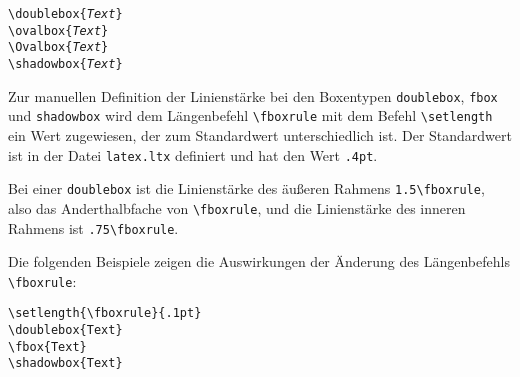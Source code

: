 \begin{center}
\hspace{5mm}
\hspace{5mm}
\hspace{5mm}
\end{center}

\begin{boxedminipage}{\textwidth}
\texttt{\textbackslash doublebox\{\textsl{Text}\}}\\
\texttt{\textbackslash ovalbox\{\textsl{Text}\}}\\
\texttt{\textbackslash Ovalbox\{\textsl{Text}\}}\\
\texttt{\textbackslash shadowbox\{\textsl{Text}\}}
\end{boxedminipage}

Zur manuellen Definition der Linienstärke bei den Boxentypen \verb!doublebox!, \verb!fbox! und \verb!shadowbox! wird dem Längenbefehl \verb!\fboxrule! mit dem Befehl \verb!\setlength! ein Wert zugewiesen, der zum Standardwert unterschiedlich ist. Der Standardwert ist in der Datei \verb!latex.ltx! definiert und hat den Wert \verb!.4pt!. 

Bei einer \verb!doublebox! ist die Linienstärke des äußeren Rahmens \verb!1.5\fboxrule!, also das Anderthalbfache von \verb!\fboxrule!, und die Linienstärke des inneren Rahmens ist \verb!.75\fboxrule!.

Die folgenden Beispiele zeigen die Auswirkungen der Änderung des Längenbefehls \verb!\fboxrule!:

\begin{minipage}[c]{0.5\textwidth}
\setlength{\parskip}{1em}
\setlength{\fboxrule}{.1pt}
\hspace{5mm}
\hspace{5mm}
\hspace{5mm}
\hfill
\end{minipage}
\hfill
\begin{minipage}[c]{0.48\textwidth}
\setlength{\parskip}{1em}
\begin{lstlisting}[label=fboxrule1, style=customlatex]
\setlength{\fboxrule}{.1pt}
\doublebox{Text} 
\fbox{Text}
\shadowbox{Text}
\end{lstlisting}
\end{minipage}

